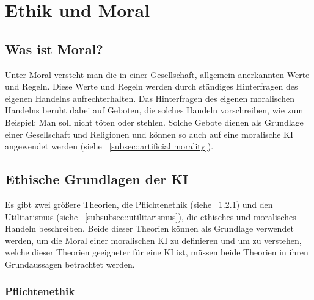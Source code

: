 \section{Ethik und Moral}\label{sec:ethik und moral}

\subsection{Was ist Moral?}\label{subsec::moral}

Unter Moral versteht man die in einer Gesellschaft, allgemein anerkannten Werte und Regeln.
Diese Werte und Regeln werden durch ständiges Hinterfragen des eigenen Handelns aufrechterhalten.
Das Hinterfragen des eigenen moralischen Handelns beruht dabei auf Geboten, die solches Handeln vorschreiben,
wie zum Beispiel: Man soll nicht töten oder stehlen.
Solche Gebote dienen als Grundlage einer Gesellschaft und Religionen und können so auch auf
eine moralische KI angewendet werden (siehe ~\ref{subsec::artificial morality}). %


\subsection{Ethische Grundlagen der KI}\label{subsec::ethische grundlagen}

Es gibt zwei größere Theorien, die Pflichtenethik (siehe ~\ref{subsubsec::pflichtenethik}) und den Utilitarismus (siehe ~\ref{subsubsec::utilitarismus}),
die ethisches und moralisches Handeln beschreiben.
Beide dieser Theorien können als Grundlage verwendet werden, um die Moral einer moralischen KI zu definieren und um zu verstehen, welche
dieser Theorien geeigneter für eine KI ist, müssen beide Theorien in ihren Grundaussagen betrachtet werden.

\subsubsection{Pflichtenethik}\label{subsubsec::pflichtenethik}

